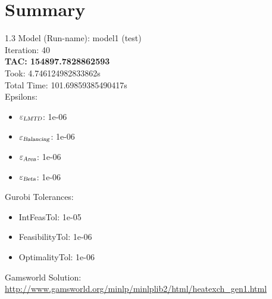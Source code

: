 \documentclass{article}%
\begin{document}
%
\normalsize%
\section{Summary}%
\thispagestyle{plain}%
\begin{spacing}{1.3}%
\Large%
Model (Run-name): model1 (test)\\%
Iteration: 40\\%
\textbf{TAC: 154897.7828862593}\\%
Took: 4.746124982833862s\\%
Total Time: 101.69859385490417s\\%
Epsilons:%
\begin{itemize}%
	\item $\varepsilon_{\textsl{LMTD}}$: 1e-06%
	\item $\varepsilon_{\textsl{Balancing}}$: 1e-06%
	\item $\varepsilon_{\textsl{Area}}$: 1e-06%
	\item $\varepsilon_{\textsl{Beta}}$: 1e-06%
\end{itemize}%
Gurobi Tolerances:%
\begin{itemize}%
	\item IntFeasTol: 1e-05%
	\item FeasibilityTol: 1e-06%
	\item OptimalityTol: 1e-06%
\end{itemize}%
\end{spacing}%
\normalsize%
Gamsworld Solution: \url{http://www.gamsworld.org/minlp/minlplib2/html/heatexch_gen1.html}%
%
\clearpage%
\end{document}
